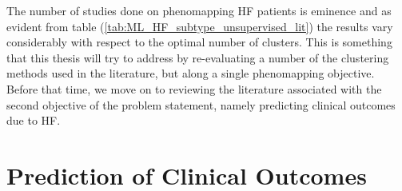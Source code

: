 \documentclass[../thesis.tex]{subfiles}
\begin{document}
\indent The number of studies done on phenomapping HF patients is eminence and as evident from table (\ref{tab:ML_HF_subtype_unsupervised_lit}) the results vary considerably with respect to the optimal number of clusters. This is something that this thesis will try to address by re-evaluating a number of the clustering methods used in the literature, but along a single phenomapping objective. Before that time, we move on to reviewing the literature associated with the second objective of the problem statement, namely predicting clinical outcomes due to HF.

\section{Prediction of Clinical Outcomes}
\label{sec:predclincout}
\end{document}
